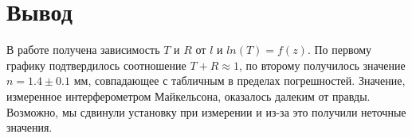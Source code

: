 \documentclass[a4paper]{article}
\begin{document}
\section{Вывод} 
 
В работе получена зависимость $T$ и $R$ от $l$ и $ln(T) = f(z)$. По первому графику подтвердилось соотношение $T + R \approx 1$, по второму получилось значение $n = 1.4 ± 0.1$ мм, совпадающее с табличным в пределах
погрешностей. Значение, измеренное интерферометром Майкельсона, оказалось далеким от правды. Возможно, мы сдвинули установку при измерении и из-за это получили неточные значения.
\end{document}

